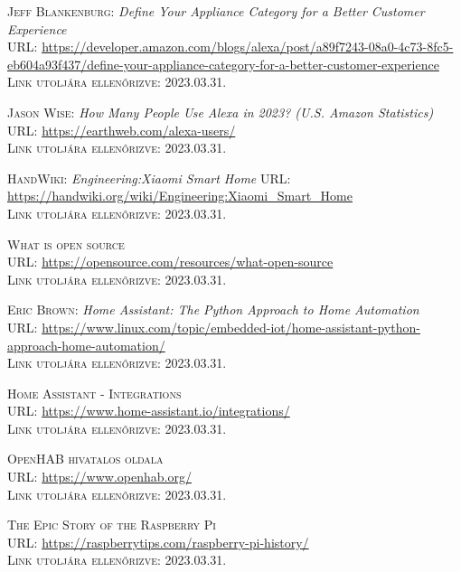 \documentclass[
]{thesis-ekf}
\theoremstyle{definition}
\theoremstyle{remark}
\begin{document}
	\begin{thebibliography}{20}
		
		\textsc{Jeff Blankenburg}: \emph{Define Your Appliance Category for a Better Customer Experience}\\
		\textsc{URL:} \url{https://developer.amazon.com/blogs/alexa/post/a89f7243-08a0-4c73-8fc5-eb604a93f437/define-your-appliance-category-for-a-better-customer-experience}\\
		\textsc{Link utoljára ellenőrizve:} 2023.03.31.
		
		\textsc{Jason Wise}: \emph{How Many People Use Alexa in 2023? (U.S. Amazon Statistics)} \\
		\textsc{URL:} \url{https://earthweb.com/alexa-users/}\\
		\textsc{Link utoljára ellenőrizve:} 2023.03.31.
		
		\textsc{HandWiki}: \emph{Engineering:Xiaomi Smart Home}
		\textsc{URL:} \url{https://handwiki.org/wiki/Engineering:Xiaomi_Smart_Home}\\
		\textsc{Link utoljára ellenőrizve:} 2023.03.31.
		
		\textsc{What is open source}\\
		\textsc{URL:} \url{https://opensource.com/resources/what-open-source}\\
		\textsc{Link utoljára ellenőrizve:} 2023.03.31.
		
		\textsc{Eric Brown}: \emph{Home Assistant: The Python Approach to Home Automation}\\
		\textsc{URL:} \url{https://www.linux.com/topic/embedded-iot/home-assistant-python-approach-home-automation/}\\
		\textsc{Link utoljára ellenőrizve:} 2023.03.31.
		
		\textsc{Home Assistant - Integrations}\\
		\textsc{URL:} \url{https://www.home-assistant.io/integrations/}\\
		\textsc{Link utoljára ellenőrizve:} 2023.03.31.
		
		\textsc{OpenHAB hivatalos oldala}\\
		\textsc{URL:} \url{https://www.openhab.org/}\\
		\textsc{Link utoljára ellenőrizve:} 2023.03.31.
		
		\textsc{The Epic Story of the Raspberry Pi}\\
		\textsc{URL:} \url{https://raspberrytips.com/raspberry-pi-history/}\\
		\textsc{Link utoljára ellenőrizve:} 2023.03.31.
		

\end{thebibliography}
\end{document}
